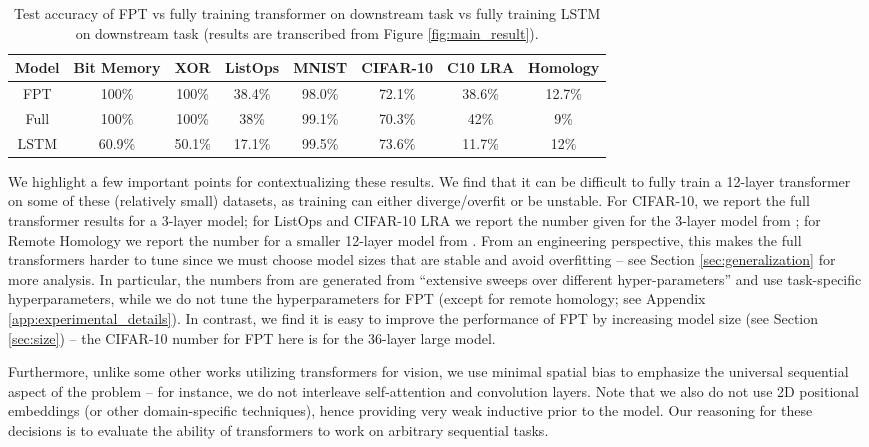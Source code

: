 \begin{table}[h] 
\begin{center}
\begin{tabular}{c|ccccccc}
\toprule
\textbf{Model} & \multicolumn{1}{c}{\bf Bit Memory} & \multicolumn{1}{c}{\bf XOR} & \multicolumn{1}{c}{\bf ListOps} & \multicolumn{1}{c}{\bf MNIST} & \multicolumn{1}{c}{\bf CIFAR-10} & \multicolumn{1}{c}{\bf C10 LRA} & \multicolumn{1}{c}{\bf Homology} \\
\midrule
FPT & 100\% & 100\% & 38.4\% & 98.0\% & 72.1\% & 38.6\% & 12.7\% \\
Full & 100\% & 100\% & 38\% & 99.1\% & 70.3\% & 42\% & 9\% \\
LSTM & 60.9\% & 50.1\% & 17.1\% & 99.5\% & 73.6\% & 11.7\% & 12\% \\
\bottomrule
\end{tabular}
\end{center}
\caption{Test accuracy of FPT vs fully training transformer on downstream task vs fully training LSTM on downstream task (results are transcribed from Figure \ref{fig:main_result}).} \label{table:main_result}
\end{table}

We highlight a few important points for contextualizing these results.
We find that it can be difficult to fully train a 12-layer transformer on some of these (relatively small) datasets, as training can either diverge/overfit or be unstable.
For CIFAR-10, we report the full transformer results for a 3-layer model; for ListOps and CIFAR-10 LRA we report the number given for the 3-layer model from \cite{tay2020lra}; for Remote Homology we report the number for a smaller 12-layer model from \cite{rap2019tape}.
From an engineering perspective, this makes the full transformers harder to tune since we must choose model sizes that are stable and avoid overfitting -- see Section \ref{sec:generalization} for more analysis.
In particular, the numbers from \cite{tay2020lra} are generated from ``extensive sweeps over different hyper-parameters'' and use task-specific hyperparameters, while we do not tune the hyperparameters for FPT (except for remote homology; see Appendix \ref{app:experimental_details}).
In contrast, we find it is easy to improve the performance of FPT by increasing model size (see Section \ref{sec:size}) -- the CIFAR-10 number for FPT here is for the 36-layer large model.

Furthermore, unlike some other works utilizing transformers for vision, we use minimal spatial bias to emphasize the universal sequential aspect of the problem -- for instance, we do not interleave self-attention and convolution layers.
Note that we also do not use 2D positional embeddings (or other domain-specific techniques), hence providing very weak inductive prior to the model.
Our reasoning for these decisions is to evaluate the ability of transformers to work on arbitrary sequential tasks.

